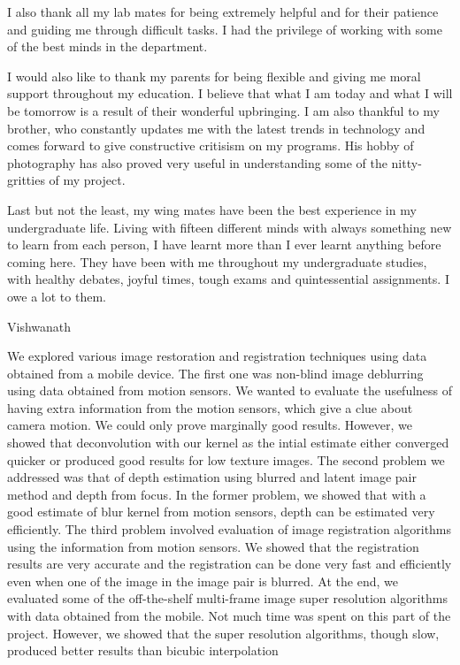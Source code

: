\documentclass[BTech]{iitmdiss}
\begin{document}
I also thank all my lab mates for being extremely helpful and
for their patience and guiding me through difficult tasks. I had the
privilege of working with some of the best minds in the department.

I would also like to thank my parents for being flexible and giving me moral
support throughout my education. I believe that what I am today and what
I will be tomorrow is a result of their wonderful upbringing. I  am also
thankful to my brother, who constantly updates me with the latest trends
in technology and comes forward to give constructive critisism on my
programs. His hobby of photography has also proved very useful in 
understanding some of the nitty-gritties of my project.

Last but not the least, my wing mates have been the best 
experience in my undergraduate life. Living with fifteen different minds
with always something new to learn from each person, I have learnt more
than I ever learnt anything before coming here. They have been with me
throughout my undergraduate studies, with healthy debates, joyful times,
tough exams and quintessential assignments. I owe a lot to them.

Vishwanath

\abstract
We explored various image restoration and registration techniques using 
data obtained from a mobile device. The first one was non-blind image
deblurring using data obtained from motion sensors. We wanted to evaluate
the usefulness of having extra information from the motion sensors, which
give a clue about camera motion. We could only prove marginally good 
results. However, we showed that deconvolution with our kernel as the 
intial estimate either converged quicker or produced good results for low
texture images. The second problem we addressed was that of depth
estimation using blurred and latent image pair method and depth from
focus. In the former problem, we showed that with a good estimate of 
blur kernel from motion
sensors, depth can be estimated very efficiently. The third problem 
involved evaluation of image registration algorithms using the information
from motion sensors. We showed that the registration results are very 
accurate and the registration can be done very fast and efficiently even
when one of the image in the image pair is blurred. At the end, we 
evaluated some of the off-the-shelf multi-frame image super resolution
 algorithms with data obtained from the mobile. Not much time was spent on
this part of the project. However, we showed that the super resolution
algorithms, though slow, produced better results than bicubic interpolation
\end{document}
